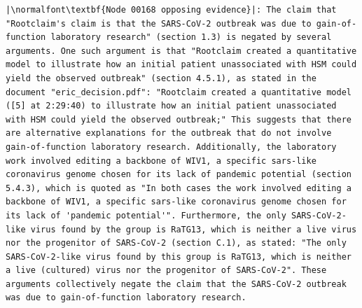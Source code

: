\documentclass{article}
\begin{document}
\begin{lstlisting}
|\normalfont\textbf{Node 00168 opposing evidence}|: The claim that "Rootclaim's claim is that the SARS-CoV-2 outbreak was due to gain-of-function laboratory research" (section 1.3) is negated by several arguments. One such argument is that "Rootclaim created a quantitative model to illustrate how an initial patient unassociated with HSM could yield the observed outbreak" (section 4.5.1), as stated in the document "eric_decision.pdf": "Rootclaim created a quantitative model ([5] at 2:29:40) to illustrate how an initial patient unassociated with HSM could yield the observed outbreak;" This suggests that there are alternative explanations for the outbreak that do not involve gain-of-function laboratory research. Additionally, the laboratory work involved editing a backbone of WIV1, a specific sars-like coronavirus genome chosen for its lack of pandemic potential (section 5.4.3), which is quoted as "In both cases the work involved editing a backbone of WIV1, a specific sars-like coronavirus genome chosen for its lack of 'pandemic potential'". Furthermore, the only SARS-CoV-2-like virus found by the group is RaTG13, which is neither a live virus nor the progenitor of SARS-CoV-2 (section C.1), as stated: "The only SARS-CoV-2-like virus found by this group is RaTG13, which is neither a live (cultured) virus nor the progenitor of SARS-CoV-2". These arguments collectively negate the claim that the SARS-CoV-2 outbreak was due to gain-of-function laboratory research.
\end{lstlisting}
\end{document}
